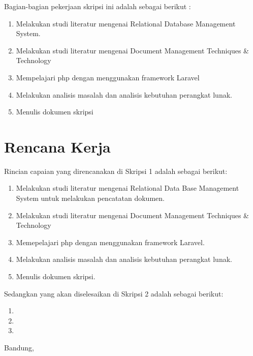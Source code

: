 \documentclass[a4paper,twoside]{article}
\begin{document}
Bagian-bagian pekerjaan skripsi ini adalah sebagai berikut :
	\begin{enumerate}
		\item Melakukan studi literatur mengenai Relational Database Management System.
		\item Melakukan studi literatur mengenai Document Management Techniques \& Technology 
		\item Mempelajari php dengan menggunakan framework Laravel
		\item Melakukan analisis masalah dan analisis kebutuhan perangkat lunak.
		
		\item Menulis dokumen skripsi
	\end{enumerate}

\section{Rencana Kerja}
Rincian capaian yang direncanakan di Skripsi 1 adalah sebagai berikut:
	\begin{enumerate}
		\item Melakukan studi literatur mengenai Relational Data Base Management System untuk melakukan pencatatan dokumen.
		\item Melakukan studi literatur mengenai 		Document Management Techniques \& Technology
		\item Memepelajari php dengan menggunakan framework Laravel.
		\item Melakukan analisis masalah dan analisis kebutuhan perangkat lunak.
		\item Menulis dokumen skripsi.
\end{enumerate}

Sedangkan yang akan diselesaikan di Skripsi 2 adalah sebagai berikut:
\begin{enumerate}
\item
\item
\item
\end{enumerate}

\vspace{1cm}
\centering Bandung, \tanggal\\
\vspace{2cm} \nama \\ 
\vspace{1cm}
\end{document}
